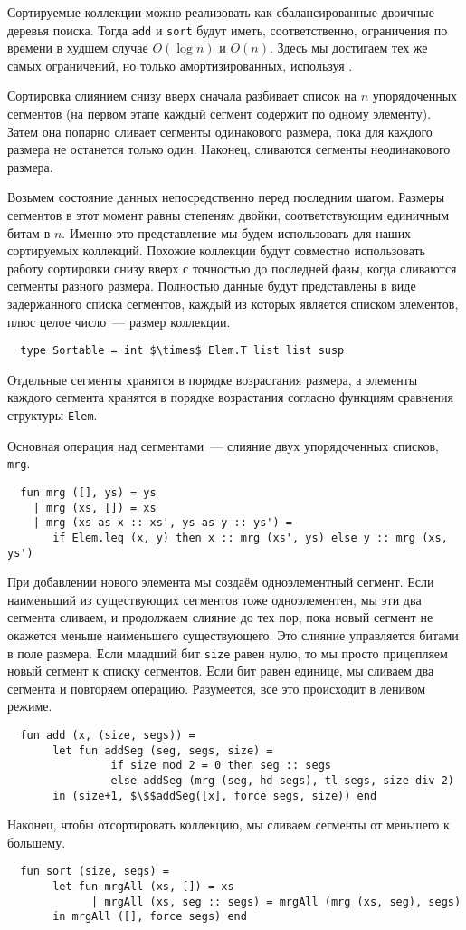 Сортируемые коллекции можно реализовать как сбалансированные двоичные
деревья поиска. Тогда \lstinline!add! и \lstinline!sort! будут иметь,
соответственно, ограничения по времени в худшем случае $O(\log n)$ и
$O(n)$. Здесь мы достигаем тех же самых ограничений, но только
амортизированных, используя .

Сортировка слиянием снизу вверх сначала разбивает список на $n$
упорядоченных сегментов (на первом этапе каждый сегмент содержит по
одному элементу). Затем она попарно сливает сегменты одинакового
размера, пока для каждого размера не останется только один. Наконец,
сливаются сегменты неодинакового размера.

Возьмем состояние данных непосредственно перед последним
шагом. Размеры сегментов в этот момент равны степеням двойки,
соответствующим единичным битам в $n$.  Именно это представление мы
будем использовать для наших сортируемых коллекций.  Похожие коллекции
будут совместно использовать работу сортировки снизу вверх с точностью
до последней фазы, когда сливаются сегменты разного размера.
Полностью данные будут представлены в виде задержанного списка
сегментов, каждый из которых является списком элементов, плюс целое
число~--- размер коллекции.
\begin{lstlisting}
  type Sortable = int $\times$ Elem.T list list susp
\end{lstlisting}
Отдельные сегменты хранятся в порядке возрастания размера, а элементы
каждого сегмента хранятся в порядке возрастания согласно функциям
сравнения структуры \lstinline!Elem!.

Основная операция над сегментами~--- слияние двух упорядоченных
списков, \lstinline!mrg!.
\begin{lstlisting}
  fun mrg ([], ys) = ys
    | mrg (xs, []) = xs
    | mrg (xs as x :: xs', ys as y :: ys') =
       if Elem.leq (x, y) then x :: mrg (xs', ys) else y :: mrg (xs, ys')
\end{lstlisting}
При добавлении нового элемента мы создаём одноэлементный сегмент. Если
наименьший из существующих сегментов тоже одноэлементен, мы эти два
сегмента сливаем, и продолжаем слияние до тех пор, пока новый сегмент
не окажется меньше наименьшего существующего. Это слияние управляется
битами в поле размера. Если младший бит \lstinline!size! равен нулю, то
мы просто прицепляем новый сегмент к списку сегментов. Если бит равен
единице, мы сливаем два сегмента и повторяем операцию. Разумеется, все
это происходит в ленивом режиме.
\begin{lstlisting}
  fun add (x, (size, segs)) =
       let fun addSeg (seg, segs, size) =
                if size mod 2 = 0 then seg :: segs
                else addSeg (mrg (seg, hd segs), tl segs, size div 2)
       in (size+1, $\$$addSeg([x], force segs, size)) end
\end{lstlisting}
Наконец, чтобы отсортировать коллекцию, мы сливаем сегменты от
меньшего к большему.
\begin{lstlisting}
  fun sort (size, segs) =
       let fun mrgAll (xs, []) = xs
             | mrgAll (xs, seg :: segs) = mrgAll (mrg (xs, seg), segs)
       in mrgAll ([], force segs) end
\end{lstlisting}

